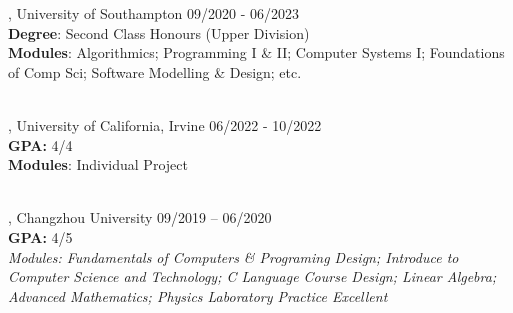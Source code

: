 
, University of Southampton	\hfill 09/2020 - 06/2023
\\ \textbf{Degree}: Second Class Honours (Upper Division)
\\ \textbf{Modules}: Algorithmics; Programming I \& II; Computer Systems I; Foundations of Comp Sci; Software Modelling \& Design; etc.\\~

, University of California, Irvine  \hfill 06/2022 - 10/2022
\\ \textbf{GPA:} 4/4
\\ \textbf{Modules}: Individual Project\\~

, Changzhou University \hfill	09/2019 – 06/2020
\\ \textbf{GPA:} 4/5
\\ \textit{Modules: Fundamentals of Computers \& Programing Design; Introduce to Computer Science and Technology; C Language Course Design; Linear Algebra; Advanced Mathematics; Physics Laboratory Practice Excellent}



